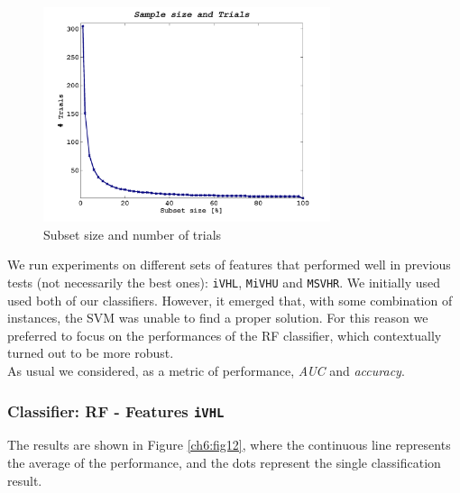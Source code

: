 \begin{figure}[!ht]
 \begin{center}
  \includegraphics[width=0.75\textwidth]{./images/exp04/iVHL_trials.png}
  \caption[subset size and trials]{Subset size and number of trials}
  \label{ch6:fig11}
 \end{center}
\end{figure}

\vspace{0.5cm}

We run experiments on different sets of features that performed well in previous tests (not necessarily the best ones): \texttt{iVHL}, \texttt{MiVHU} and \texttt{MSVHR}.
We initially used used both of our classifiers. However, it emerged that, with some combination of instances, the \Gls{SVM} was unable to find a proper solution.
For this reason we preferred to focus on the performances of the \Gls{RF} classifier, which contextually turned out to be more robust.\\
As usual we considered, as a metric of performance, \textit{AUC} and \textit{accuracy}.

\vspace{1.0cm}

\subsubsection{Classifier: RF - Features \texttt{iVHL}}

The results are shown in Figure \ref{ch6:fig12}, where the continuous line represents the average of the performance, and the dots represent the
single classification result.



